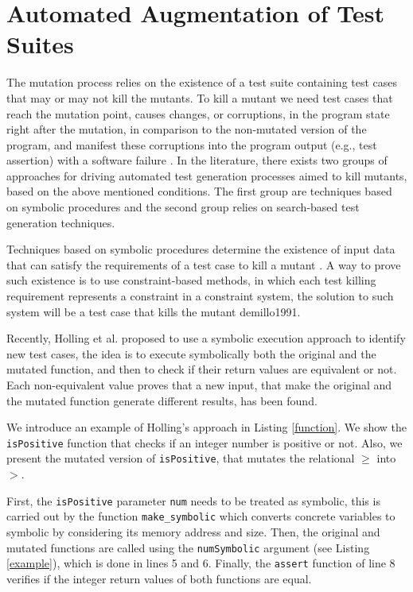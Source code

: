 
\section{Automated Augmentation of Test Suites}
\label{sec:testGeneration}

The mutation process relies on the existence of a test suite containing test cases that may or may not kill the mutants.
To kill a mutant we need test cases that reach the mutation point, causes changes, or corruptions, in the program state right after the mutation, in comparison to the non-mutated version of the program, and manifest these corruptions into the program output (e.g., test assertion) with a software failure \cite{papadakis2019mutation}.
In the literature, there exists two groups of approaches for driving automated test generation processes aimed to kill mutants, based on the above mentioned conditions. The first group are techniques based on symbolic procedures and the second group relies on search-based test generation techniques.

Techniques based on symbolic procedures determine the existence of input data that can satisfy the requirements of a test case to kill a mutant \cite{offutt1997automatically}. A way to prove such existence is to use constraint-based methods, in which each test killing requirement represents a constraint in a constraint system, the solution to such system will be a test case that kills the mutant demillo1991.

Recently, Holling et al. \cite{holling2016nequivack} proposed to use a symbolic execution approach to identify new test cases, the idea is to execute symbolically both the original and the mutated function, and then to check if their return values are equivalent or not. Each non-equivalent value proves that a new input, that make the original and the mutated function generate different results, has been found. 

We introduce an example of Holling's approach in Listing \ref{function}. We show the \texttt{isPositive} function that checks if an integer number is positive or not. Also, we present the mutated version of \texttt{isPositive}, that mutates the relational $\geq$ into $>$.

First, the \texttt{isPositive} parameter \texttt{num} needs to be treated as symbolic, this is carried out by the function \texttt{make\_symbolic} which converts concrete variables to symbolic by considering its memory address and size. Then, the original and mutated functions are called using the \texttt{numSymbolic} argument (see Listing \ref{example}), which is done in lines 5 and 6. Finally, the \texttt{assert} function of line 8 verifies if the integer return values of both functions are equal.


